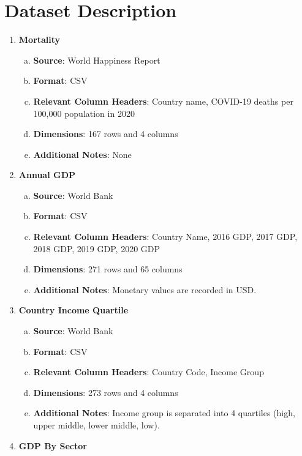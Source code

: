 \documentclass[fontsize=11pt]{article}
\begin{document}
\section*{Dataset Description}
\begin{enumerate}
    \item \textbf{Mortality}
        \begin{enumerate}[(a)]
            \item \textbf{Source}: World Happiness Report
            \item \textbf{Format}: CSV
            \item \textbf{Relevant Column Headers}: Country name, COVID-19 deaths per 100,000 population in 2020
            \item \textbf{Dimensions}: 167 rows and 4 columns
            \item \textbf{Additional Notes}: None
        \end{enumerate}
    \item \textbf{Annual GDP}
        \begin{enumerate}[(a)]
            \item \textbf{Source}: World Bank
            \item \textbf{Format}: CSV
            \item \textbf{Relevant Column Headers}: Country Name, 2016 GDP, 2017 GDP, 2018 GDP, 2019 GDP, 2020 GDP
            \item \textbf{Dimensions}: 271 rows and 65 columns
            \item \textbf{Additional Notes}: Monetary values are recorded in USD.
        \end{enumerate}
    \item \textbf{Country Income Quartile}
        \begin{enumerate}[(a)]
            \item \textbf{Source}: World Bank
            \item \textbf{Format}: CSV
            \item \textbf{Relevant Column Headers}: Country Code, Income Group
            \item \textbf{Dimensions}: 273 rows and 4 columns
            \item \textbf{Additional Notes}: Income group is separated into 4 quartiles (high, upper middle, lower middle, low).
        \end{enumerate}
    \item \textbf{GDP By Sector}
        \begin{enumerate}[(a)]

\end{enumerate}
\end{enumerate}
\end{document}

